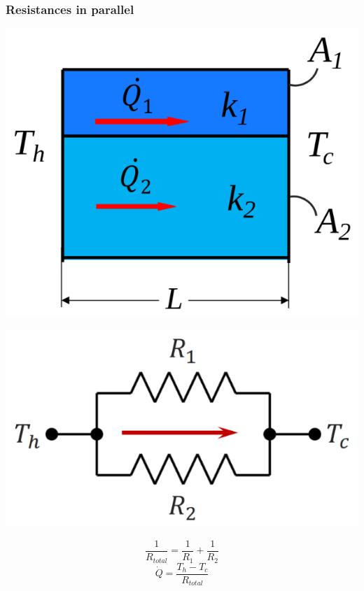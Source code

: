 \documentclass[11pt]{article}
\begin{document}
\subsubsection{Resistances in parallel}
\label{sec:orgb0985a7}
\begin{center}
\includegraphics[width=.9\linewidth]{./images/thermal-resistances-in-parallel.png}
\end{center}
\begin{center}
\includegraphics[width=.9\linewidth]{./images/thermal-resistances-in-parallel-electrical-analogy.png}
\end{center}
\[\frac{1}{R_{total}} = \frac{1}{R_1} + \frac{1}{R_2}\]
\[\dot{Q} = \frac{T_h - T_c}{R_{total}}\]
\end{document}
